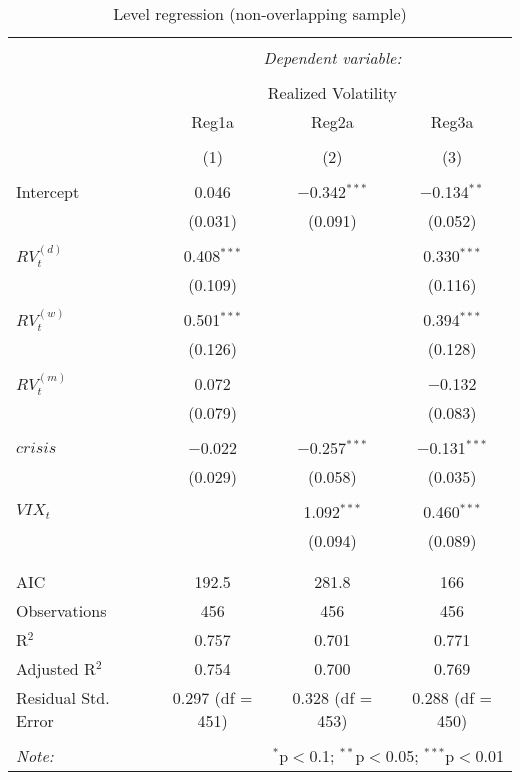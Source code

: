 
\begin{table}[!htbp] \centering 
  \caption{Level regression (non-overlapping sample)} 
  \label{tab:overlap1} 
\begin{tabular}{@{\extracolsep{5pt}}lccc} 
\\[-1.8ex]\hline 
\hline \\[-1.8ex] 
 & \multicolumn{3}{c}{\textit{Dependent variable:}} \\ 
\cline{2-4} 
\\[-1.8ex] & \multicolumn{3}{c}{Realized Volatility} \\ 
 & Reg1a & Reg2a & Reg3a \\ 
\\[-1.8ex] & (1) & (2) & (3)\\ 
\hline \\[-1.8ex] 
 Intercept & 0.046 & $-$0.342$^{***}$ & $-$0.134$^{**}$ \\ 
  & (0.031) & (0.091) & (0.052) \\ 
  & & & \\ 
 $RV^{(d)}_{t}$ & 0.408$^{***}$ &  & 0.330$^{***}$ \\ 
  & (0.109) &  & (0.116) \\ 
  & & & \\ 
 $RV^{(w)}_{t}$ & 0.501$^{***}$ &  & 0.394$^{***}$ \\ 
  & (0.126) &  & (0.128) \\ 
  & & & \\ 
 $RV^{(m)}_{t}$ & 0.072 &  & $-$0.132 \\ 
  & (0.079) &  & (0.083) \\ 
  & & & \\ 
 $crisis$ & $-$0.022 & $-$0.257$^{***}$ & $-$0.131$^{***}$ \\ 
  & (0.029) & (0.058) & (0.035) \\ 
  & & & \\ 
 $VIX_{t}$ &  & 1.092$^{***}$ & 0.460$^{***}$ \\ 
  &  & (0.094) & (0.089) \\ 
  & & & \\ 
\hline \\[-1.8ex] 
AIC & 192.5 & 281.8 & 166 \\ 
Observations & 456 & 456 & 456 \\ 
R$^{2}$ & 0.757 & 0.701 & 0.771 \\ 
Adjusted R$^{2}$ & 0.754 & 0.700 & 0.769 \\ 
Residual Std. Error & 0.297 (df = 451) & 0.328 (df = 453) & 0.288 (df = 450) \\ 
\hline 
\hline \\[-1.8ex] 
\textit{Note:}  & \multicolumn{3}{r}{$^{*}$p$<$0.1; $^{**}$p$<$0.05; $^{***}$p$<$0.01} \\ 
\end{tabular} 
\end{table} 
